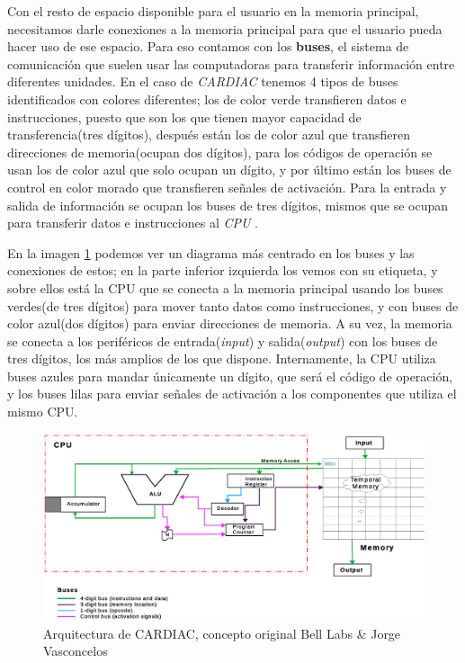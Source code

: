 \documentclass[letterpaper,12pt,oneside]{book}
\begin{document}
	Con el resto de espacio disponible para el usuario en la memoria principal, necesitamos darle conexiones a la memoria principal para
	que el usuario pueda hacer uso de ese espacio. Para eso contamos con los \textbf{buses}, el sistema de comunicación que suelen
	usar las computadoras para transferir información entre diferentes unidades. En el caso de \textit{CARDIAC} tenemos 4 tipos de buses
	identificados con colores diferentes; los de color verde transfieren datos e instrucciones, puesto que son los que tienen mayor
	capacidad de transferencia(tres dígitos), después están los de color azul que transfieren direcciones de memoria(ocupan dos dígitos),
	para los códigos de operación se usan los de color azul que solo ocupan un dígito, y por último están los buses de control en color morado
	que transfieren señales de activación. Para la entrada y salida de información se ocupan los buses de tres dígitos, mismos que
	se ocupan para transferir datos e instrucciones al \textit{CPU} \cite{hegelbarger_instruction_1968}.
	
	En la imagen \ref{fig:Arquitectura_diagrama_original} podemos ver un diagrama más centrado en los buses
	y las conexiones de estos; en la parte inferior izquierda los vemos con su etiqueta, y sobre ellos
	está la CPU que se conecta a la memoria principal usando los buses verdes(de tres dígitos) para mover tanto datos como instrucciones, y
	con buses de color azul(dos dígitos) para enviar direcciones de memoria. A su vez, la memoria se conecta a los periféricos de entrada(\textit{input})
	y salida(\textit{output}) con los buses de tres dígitos, los más amplios de los que dispone.
	Internamente, la CPU utiliza buses azules para mandar únicamente un
	dígito, que será el código de operación, y los buses lilas para enviar señales de activación a los componentes que utiliza el mismo
	CPU.	
	
	\begin{figure}[ht]
 			\centering
			\includegraphics[scale=0.5]{media/CARDIACC/Arquitectura_diagrama_original.eps}
			\caption{Arquitectura de CARDIAC, concepto original Bell Labs \& Jorge Vasconcelos}
			\label{fig:Arquitectura_diagrama_original}
	\end{figure}
	
\end{document}
